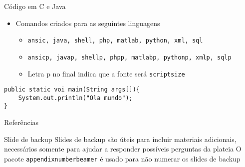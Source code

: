 \documentclass{beamer}
\begin{document}
\begin{frame}[fragile]{Código em C e Java}

\begin{itemize}
		\item Comandos criados para as seguintes linguagens
		\begin{itemize}
			\item \texttt{ansic, java, shell, php, matlab, python, xml, sql}
			\item \texttt{ansicp, javap, shellp, phpp, matlabp, pythonp, xmlp, sqlp}
			\item Letra p no final indica que a fonte será \texttt{scriptsize}
		\end{itemize}
\end{itemize}



\javap
\begin{lstlisting}
public static voi main(String args[]){
	System.out.println("Ola mundo");
}
\end{lstlisting}		
\end{frame}

    \appendix
    \begin{frame}{Referências}
        \nocite{*}
        
        
    \end{frame}
    
    \begin{frame}{Slide de backup}
        Slides de backup são úteis para incluir materiais adicionais, necessários somente para ajudar a responder possíveis perguntas da plateia
        \vfill
        O pacote \texttt{appendixnumberbeamer} é usado para não numerar os slides de backup
    \end{frame}
\end{document}
